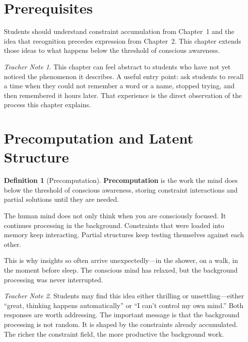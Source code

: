\documentclass[11pt]{book}
\theoremstyle{definition}
\newtheorem{definition}{Definition}[chapter]
\theoremstyle{remark}
\newtheorem{teachernote}{Teacher Note}[chapter]
\begin{document}
\section*{Prerequisites}

Students should understand constraint accumulation from Chapter~1 and
the idea that recognition precedes expression from Chapter~2. This
chapter extends those ideas to what happens below the threshold of
conscious awareness.

\begin{teachernote}
This chapter can feel abstract to students who have not yet noticed the
phenomenon it describes. A useful entry point: ask students to recall
a time when they could not remember a word or a name, stopped trying,
and then remembered it hours later. That experience is the direct
observation of the process this chapter explains.
\end{teachernote}

\section{Precomputation and Latent Structure}

\begin{definition}[Precomputation]
\textbf{Precomputation} is the work the mind does below the threshold of
conscious awareness, storing constraint interactions and partial solutions
until they are needed.
\end{definition}

The human mind does not only think when you are consciously focused. It
continues processing in the background. Constraints that were loaded into
memory keep interacting. Partial structures keep testing themselves against
each other.

This is why insights so often arrive unexpectedly---in the shower, on a walk,
in the moment before sleep. The conscious mind has relaxed, but the
background processing was never interrupted.

\begin{teachernote}
Students may find this idea either thrilling or unsettling---either
``great, thinking happens automatically'' or ``I can't control my own
mind.'' Both responses are worth addressing. The important message is
that the background processing is not random. It is shaped by the
constraints already accumulated. The richer the constraint field, the
more productive the background work.
\end{teachernote}
\end{document}
